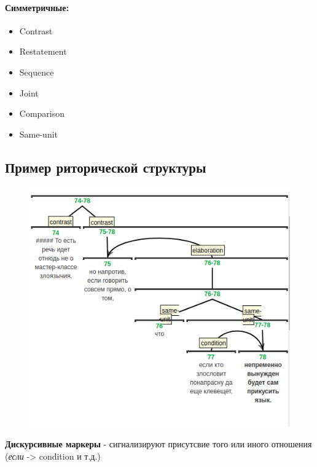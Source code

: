 \documentclass[11pt]{article}
\makeatletter
\def\maxwidth{\ifdim\Gin@nat@width>\linewidth\linewidth
    \else\Gin@nat@width\fi}
\let\Oldincludegraphics\includegraphics
\renewcommand{\includegraphics}[1]{\Oldincludegraphics[width=.8\maxwidth]{#1}}
\providecommand{\tightlist}{%
      \setlength{\itemsep}{0pt}\setlength{\parskip}{0pt}}
\makeatother
\begin{document}
\paragraph{Симметричные:}\label{ux441ux438ux43cux43cux435ux442ux440ux438ux447ux43dux44bux435}

\begin{itemize}
\tightlist
\item
  Contrast
\item
  Restatement
\item
  Sequence
\item
  Joint
\item
  Comparison
\item
  Same-unit
\end{itemize}

    \subsection{Пример риторической
структуры}\label{ux43fux440ux438ux43cux435ux440-ux440ux438ux442ux43eux440ux438ux447ux435ux441ux43aux43eux439-ux441ux442ux440ux443ux43aux442ux443ux440ux44b}

\begin{figure}
\centering
\includegraphics{dt_example.png}
\caption{}
\end{figure}

    \textbf{Дискурсивные маркеры} - сигнализируют присутсвие того или иного
отношения (\emph{если} -\textgreater{} condition и т.д.)
\end{document}
